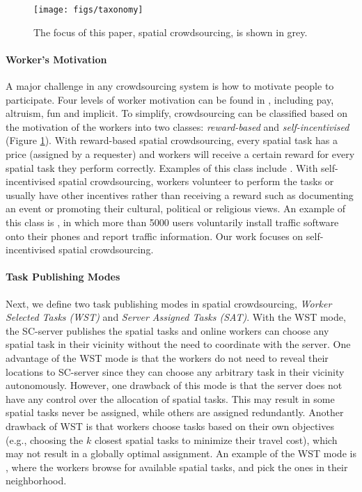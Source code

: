 \documentclass{USC-Thesis}
\numberwithin{equation}{chapter}
\begin{document}
\begin{figure}[!htb]\centering
  \texttt{[image: figs/taxonomy]}
  \caption{The focus of this paper, spatial crowdsourcing, is shown in grey.}
  \label{fig:taxonomy}
\end{figure}

\paragraph{Worker's Motivation} 
A major challenge in any crowdsourcing system is how to motivate people to participate. Four levels of worker motivation can be found in \cite{quinn2011human}, including pay, altruism, fun and implicit. To simplify, crowdsourcing can be classified based on the motivation of the workers into two classes: \textit{reward-based} and \textit{self-incentivised} (Figure \ref{fig:taxonomy}). With reward-based spatial crowdsourcing, every spatial task has a price (assigned by a requester) and workers will receive a certain reward for every spatial task they perform correctly. Examples of this class include \cite{fieldagent,gigwalk}. With self-incentivised spatial crowdsourcing, workers volunteer to perform the tasks or usually have other incentives rather than receiving a reward such as documenting an event or promoting their cultural, political or religious views. An example of this class is \cite{trafficucb}, in which more than 5000 users voluntarily install traffic software onto their phones and report traffic information. Our work focuses on self-incentivised spatial crowdsourcing.

\paragraph{Task Publishing Modes}
Next, we define two task publishing modes in spatial crowdsourcing, \textit{Worker Selected Tasks (WST)} and \textit{Server Assigned Tasks (SAT)}. With the WST mode, the SC-server publishes the spatial tasks and online workers can choose any spatial task in their vicinity without the need to coordinate with the server. One advantage of the WST mode is that the workers do not need to reveal their locations to SC-server since they can choose any arbitrary task in their vicinity autonomously. However, one drawback of this mode is that the server does not have any control over the allocation of spatial tasks. This may result in some spatial tasks never be assigned, while others are assigned redundantly. Another drawback of WST is that workers choose tasks based on their own objectives (e.g., choosing the $k$ closest spatial tasks to minimize their travel cost), which may not result in a globally optimal assignment. An example of the WST mode is \cite{alt2010location}, where the workers browse for available spatial tasks, and pick the ones in their neighborhood.
\end{document}
